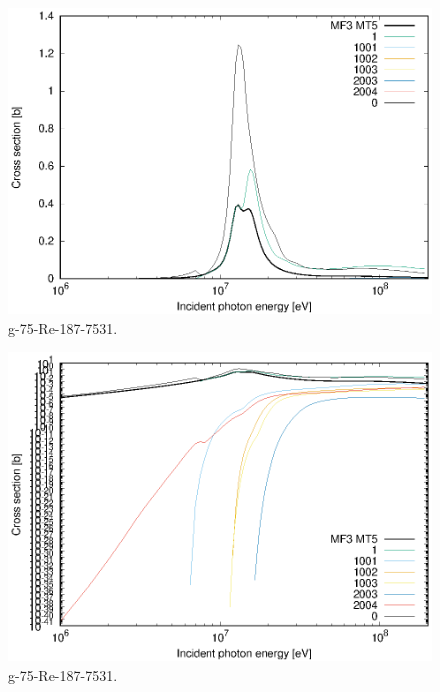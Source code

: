 \begin{figure}
 \includegraphics[width=\linewidth]{eps/g_75-Re-187_7531.eps}
  \caption{g-75-Re-187-7531.}
\end{figure}
\begin{figure}
 \includegraphics[width=\linewidth]{eps-log/g_75-Re-187_7531.eps}
 \caption{g-75-Re-187-7531.}
\end{figure}
\newpage \clearpage

